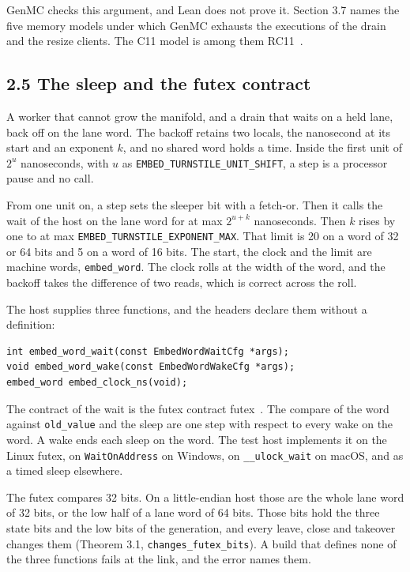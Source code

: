 GenMC checks this argument, and Lean does not prove it. Section 3.7 names the five memory models under which GenMC exhausts the executions of the drain and the resize clients. The C11 model is among them RC11~\cite{src:RC11}.

\subsection{\texorpdfstring{2.5 The sleep and the futex contract}{2.5 The sleep and the futex contract}}

A worker that cannot grow the manifold, and a drain that waits on a held lane, back off on the lane word. The backoff retains two locals, the nanosecond at its start and an exponent \(k\), and no shared word holds a time. Inside the first unit of \(2^{u}\) nanoseconds, with \(u\) as \texttt{EMBED\_\allowbreak{}TURNSTILE\_\allowbreak{}UNIT\_\allowbreak{}SHIFT}, a step is a processor pause and no call.

From one unit on, a step sets the sleeper bit with a fetch-or. Then it calls the wait of the host on the lane word for at max \(2^{u+k}\) nanoseconds. Then \(k\) rises by one to at max \texttt{EMBED\_\allowbreak{}TURNSTILE\_\allowbreak{}EXPONENT\_\allowbreak{}MAX}. That limit is 20 on a word of 32 or 64 bits and 5 on a word of 16 bits. The start, the clock and the limit are machine words, \texttt{embed\_\allowbreak{}word}. The clock rolls at the width of the word, and the backoff takes the difference of two reads, which is correct across the roll.

The host supplies three functions, and the headers declare them without a definition:

\begin{Verbatim}
int embed_word_wait(const EmbedWordWaitCfg *args);
void embed_word_wake(const EmbedWordWakeCfg *args);
embed_word embed_clock_ns(void);
\end{Verbatim}

The contract of the wait is the futex contract futex~\cite{src:futex}. The compare of the word against \texttt{old\_\allowbreak{}value} and the sleep are one step with respect to every wake on the word. A wake ends each sleep on the word. The test host implements it on the Linux futex, on \texttt{Wait\allowbreak{}On\allowbreak{}Address} on Windows, on \texttt{\_\allowbreak{}\_\allowbreak{}ulock\_\allowbreak{}wait} on macOS, and as a timed sleep elsewhere.

The futex compares 32 bits. On a little-endian host those are the whole lane word of 32 bits, or the low half of a lane word of 64 bits. Those bits hold the three state bits and the low bits of the generation, and every leave, close and takeover changes them (Theorem 3.1, \texttt{changes\_\allowbreak{}futex\_\allowbreak{}bits}). A build that defines none of the three functions fails at the link, and the error names them.


